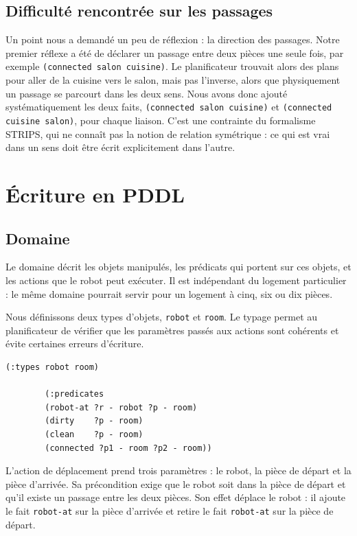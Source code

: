 \documentclass[a4paper, 11pt]{report}
\begin{document}
	\subsection{Difficulté rencontrée sur les passages}
	
	Un point nous a demandé un peu de réflexion : la direction des passages.
	Notre premier réflexe a été de déclarer un passage entre deux pièces une
	seule fois, par exemple \texttt{(connected salon cuisine)}. Le planificateur
	trouvait alors des plans pour aller de la cuisine vers le salon, mais pas
	l'inverse, alors que physiquement un passage se parcourt dans les deux sens.
	Nous avons donc ajouté systématiquement les deux faits, \texttt{(connected
		salon cuisine)} et \texttt{(connected cuisine salon)}, pour chaque liaison.
	C'est une contrainte du formalisme STRIPS, qui ne connaît pas la notion de
	relation symétrique : ce qui est vrai dans un sens doit être écrit
	explicitement dans l'autre.
	
	\section{Écriture en PDDL}
	
	\subsection{Domaine}
	
	Le domaine décrit les objets manipulés, les prédicats qui portent sur ces
	objets, et les actions que le robot peut exécuter. Il est indépendant du
	logement particulier : le même domaine pourrait servir pour un logement à
	cinq, six ou dix pièces.
	
	Nous définissons deux types d'objets, \texttt{robot} et \texttt{room}. Le
	typage permet au planificateur de vérifier que les paramètres passés aux
	actions sont cohérents et évite certaines erreurs d'écriture.
	
	\begin{lstlisting}[style=pddl, caption={Déclaration des types et des prédicats du domaine.}]
		(:types robot room)
		
		(:predicates
		(robot-at ?r - robot ?p - room)
		(dirty    ?p - room)
		(clean    ?p - room)
		(connected ?p1 - room ?p2 - room))
	\end{lstlisting}
	
	L'action de déplacement prend trois paramètres : le robot, la pièce de
	départ et la pièce d'arrivée. Sa précondition exige que le robot soit dans
	la pièce de départ et qu'il existe un passage entre les deux pièces. Son
	effet déplace le robot : il ajoute le fait \texttt{robot-at} sur la pièce
	d'arrivée et retire le fait \texttt{robot-at} sur la pièce de départ.
	
\end{document}
